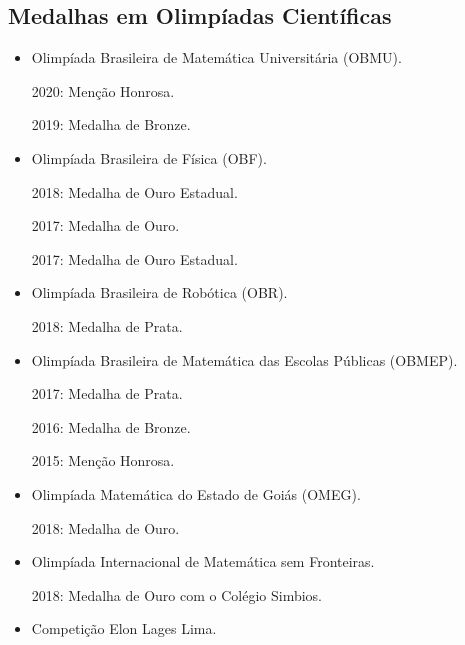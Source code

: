 \documentclass[a4paper]{article}
\begin{document}
\begin{paracol}{2}
\vspace{-1.0em}

\medskip

\section*{\faAward \; Medalhas em Olimpíadas Científicas}
\scriptsize
\hspace{-2em}
\begin{minipage}[t]{0.24\textwidth}
\begin{itemize}
\item Olimpíada Brasileira de Matemática \newline Universitária (OBMU).

2020: Menção Honrosa.

2019: Medalha de Bronze.

\item Olimpíada Brasileira de Física (OBF).

2018: Medalha de Ouro Estadual.

2017: Medalha de Ouro.

2017: Medalha de Ouro Estadual.

\item Olimpíada Brasileira de Robótica (OBR).

2018: Medalha de Prata.

\end{itemize}
\end{minipage}
\begin{minipage}[t]{0.24\textwidth}
\begin{itemize}
\item Olimpíada Brasileira de Matemática \newline das Escolas Públicas (OBMEP).

2017: Medalha de Prata.

2016: Medalha de Bronze.

2015: Menção Honrosa.

\item Olimpíada Matemática do Estado de Goiás (OMEG).

2018: Medalha de Ouro.

\item Olimpíada Internacional de \newline Matemática sem Fronteiras.

2018: Medalha de Ouro com o Colégio Simbios.

\end{itemize}
\end{minipage}
\begin{minipage}[t]{0.24\textwidth}
\begin{itemize}
\item Competição Elon Lages Lima.


\end{itemize}
\end{minipage}
\end{paracol}
\end{document}
